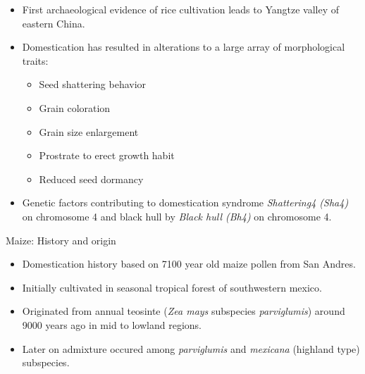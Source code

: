 \documentclass[
  ignorenonframetext,
  aspectratio=169]{beamer}
\providecommand{\tightlist}{%
  \setlength{\itemsep}{0pt}\setlength{\parskip}{0pt}}
\begin{document}
\begin{frame}{}
\protect\hypertarget{section-9}{}
\begin{itemize}
\tightlist
\item
  First archaeological evidence of rice cultivation leads to Yangtze
  valley of eastern China.
\item
  Domestication has resulted in alterations to a large array of
  morphological traits:

  \begin{itemize}
  \tightlist
  \item
    Seed shattering behavior
  \item
    Grain coloration
  \item
    Grain size enlargement
  \item
    Prostrate to erect growth habit
  \item
    Reduced seed dormancy
  \end{itemize}
\item
  Genetic factors contributing to domestication syndrome
  \emph{Shattering4 (Sha4)} on chromosome 4 and black hull by
  \emph{Black hull (Bh4)} on chromosome 4.
\end{itemize}
\end{frame}

\begin{frame}{Maize: History and origin}
\protect\hypertarget{maize-history-and-origin}{}
\begin{itemize}
\tightlist
\item
  Domestication history based on 7100 year old maize pollen from San
  Andres.
\item
  Initially cultivated in seasonal tropical forest of southwestern
  mexico.
\item
  Originated from annual teosinte (\emph{Zea mays} subspecies
  \emph{parviglumis}) around 9000 years ago in mid to lowland regions.
\item
  Later on admixture occured among \emph{parviglumis} and
  \emph{mexicana} (highland type) subspecies.
\end{itemize}
\end{frame}
\end{document}
